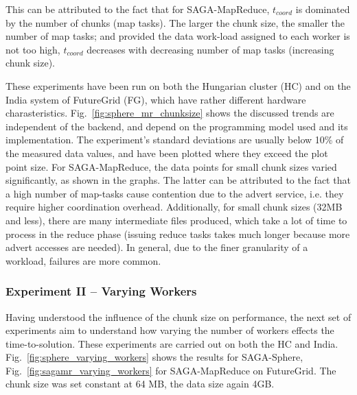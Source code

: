 \documentclass[3p,twocolumn]{elsarticle}
\begin{document}
This can be attributed to the fact that for SAGA-MapReduce,
$t_{coord}$ is dominated by the number of chunks (map tasks).
The larger the chunk size, the smaller the number
of map tasks; and provided the data work-load assigned to each worker
is not too high, $t_{coord}$ decreases with decreasing number of map
tasks (increasing chunk size).

These experiments have been run on both the Hungarian cluster (HC) and
on the India system of FutureGrid (FG), which have rather different
hardware charasteristics.  Fig.~\ref{fig:sphere_mr_chunksize} shows
the discussed trends are independent of the backend, and depend on the
programming model used and its implementation. The experiment's
standard deviations are usually below 10\% of the measured data
values, and have been plotted where they exceed the plot point size.
For SAGA-MapReduce, the data points for small chunk sizes varied
significantly, as shown in the graphs.  The latter can be attributed
to the fact that a high number of map-tasks cause contention due to
the advert service, i.e. they require higher coordination overhead.
Additionally, for small chunk sizes (32MB and less), there are many
intermediate files produced, which take a lot of time to process in
the reduce phase (issuing reduce tasks takes much longer because more
advert accesses are needed).  In general, due to the finer granularity
of a workload, failures are more common.



\subsubsection{Experiment II -- Varying Workers}

Having understood the influence of the chunk size on performance, the
next set of experiments aim to understand how varying the number of
workers effects the time-to-solution. These experiments are carried
out on both the HC and India.  Fig.~\ref{fig:sphere_varying_workers}
shows the results for SAGA-Sphere,
Fig.~\ref{fig:sagamr_varying_workers} for SAGA-MapReduce on
FutureGrid. The chunk size was set constant at 64 MB, the data size
again 4GB.
\end{document}
